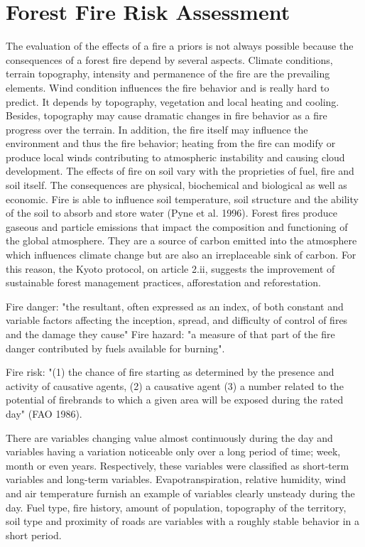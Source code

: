 {{\section{Forest Fire Risk Assessment}
	The evaluation of the effects of a fire a priors is not always possible because the consequences of a forest fire depend by several aspects. Climate conditions, terrain topography, intensity and permanence of the fire are the prevailing elements. Wind condition influences the fire behavior and is really hard to predict. It depends by topography, vegetation and local heating and cooling. Besides, topography may cause dramatic changes in fire behavior as a fire progress over the terrain. In addition, the fire itself may influence the environment and thus the fire behavior; heating from the fire can modify or produce local winds contributing to atmospheric instability and causing cloud development. The effects of fire on soil vary with the proprieties of fuel, fire and soil itself. The consequences are physical, biochemical and biological as well as economic. Fire is able to influence soil temperature, soil structure and the ability of the soil to absorb and store water (Pyne et al. 1996). Forest fires produce gaseous and particle emissions that impact the composition and functioning of the global atmosphere. They are a source of carbon emitted into the atmosphere which influences climate change but are also an irreplaceable sink of carbon. For this reason, the Kyoto protocol, on article 2.ii, suggests the improvement of sustainable forest management practices, afforestation and reforestation.
	
	Fire danger: "the resultant, often expressed as an index, of both constant and variable factors affecting the inception, spread, and difficulty of control of fires and the damage they cause"
	Fire hazard: "a measure of that part of the fire danger contributed by fuels available for burning".
	
	Fire risk: "(1) the chance of fire starting as determined by the presence and activity of causative agents, (2) a causative agent (3) a number related to the potential of firebrands to which a given area will be exposed during the rated day" (FAO 1986).
	
	There are variables changing value almost continuously during the day and variables having a variation noticeable only over a long period of time; week, month or even years. Respectively, these variables were classified as short-term variables and long-term variables. Evapotranspiration, relative humidity, wind and air temperature furnish an example of variables clearly unsteady during the day. Fuel type, fire history, amount of population, topography of the territory, soil type and proximity of roads are variables with a roughly stable behavior in a short period.
	
}}

